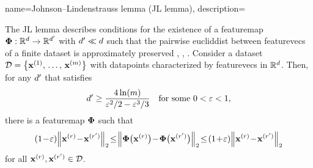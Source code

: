 {name={Johnson--Lindenstrauss lemma (JL lemma)},
	description={The JL lemma describes conditions for 
  		the existence of a \gls{featuremap} ${\bf \Phi}: \mathbb{R}^{d} \to \mathbb{R}^{d'}$ 
  		with $d' \ll d$ such that the pairwise \gls{eucliddist} 
  		between \glspl{featurevec} of a finite \gls{dataset} is approximately preserved 
  		\cite{vershynin2018high}, \cite{JMLR:v19:18-264}, \cite{johnson1984extensions}. 
  		Consider a \gls{dataset} $\mathcal{D} = \big\{{\bf x}^{(1)}, \,\dots, \,{\bf x}^{(m)} \big\}$ 
  		with \glspl{datapoint} characterized by \glspl{featurevec} in $\mathbb{R}^{d}$. 
  		Then, for any $d'$ that satisfies
		\[
	  	d' \ge \frac{4 \ln(m)}{\varepsilon^2/2 - \varepsilon^3/3} \quad \mbox{for some } 0 < \varepsilon < 1,
		\]  
   		there is a \gls{featuremap} ${\bf \Phi}$ such that \cite{ProofJLlemma}
  		\begin{equation} 
 			\label{equ_def_approx_norm_JL_lemma_dict}
 			(1\!-\!\varepsilon)\normgeneric{\featurevec^{(\sampleidx)}\!-\!\featurevec^{(\sampleidx')}}{2}  
 			\!\le\!\normgeneric{\featuremapvec\big(\featurevec^{(\sampleidx)}\big)\!-\!\featuremapvec\big(\featurevec^{(\sampleidx')}\big)}{2} 
			\!\le\!(1\!+\!\varepsilon)\normgeneric{\featurevec^{(\sampleidx)}\!-\!\featurevec^{(\sampleidx')}}{2}
 		\end{equation}
		for all ${\bf x}^{(r)}, {\bf x}^{(r')} \in \mathcal{D}$. 
		\begin{figure}[H]
			\centering
\end{figure}}}
